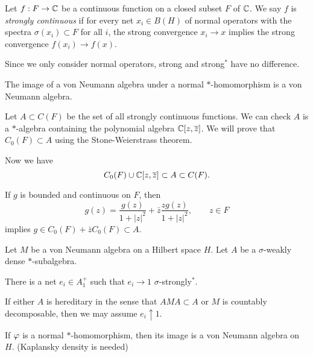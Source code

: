 \documentclass{../../large}
\begin{document}
\begin{prb}
Let $f:F\to\mathbb{C}$ be a continuous function on a closed subset $F$ of $\mathbb{C}$.
We say $f$ is \emph{strongly continuous} if for every net $x_i\in B(H)$ of normal operators with the spectra $\sigma(x_i)\subset F$ for all $i$, the strong convergence $x_i\to x$ implies the strong convergence $f(x_i)\to f(x)$.

\begin{parts}
\item Since we only consider normal operators, strong and strong$^*$ have no difference.
\item The image of a von Neumann algebra under a normal $*$-homomorphism is a von Neumann algebra.
\end{parts}

\end{prb}
\begin{pf}
Let $A\subset C(F)$ be the set of all strongly continuous functions.
We can check $A$ is a $*$-algebra containing the polynomial algebra $\mathbb{C}[z,\overline z]$.
We will prove that $C_0(F)\subset A$ using the Stone-Weierstrass theorem.

Now we have
\[C_0(F)\cup\mathbb{C}[z,\overline z]\subset A\subset C(F).\]

If $g$ is bounded and continuous on $F$, then
\[g(z)=\frac{g(z)}{1+|z|^2}+\bar z\frac{zg(z)}{1+|z|^2},\qquad z\in F\]
implies $g\in C_0(F)+\bar zC_0(F)\subset A$.

\end{pf}



\begin{prb}
Let $M$ be a von Neumann algebra on a Hilbert space $H$.
Let $A$ be a $\sigma$-weakly dense $*$-subalgebra.
\begin{parts}
\item There is a net $e_i\in A_1^+$ such that $e_i\to1$ $\sigma$-strongly$^*$.
\item If either $A$ is hereditary in the sense that $AMA\subset A$ or $M$ is countably decomposable, then we may assume $e_i\uparrow1$.
\end{parts}
\end{prb}



\begin{parts}
\item If $\varphi$ is a normal $*$-homomorphism, then its image is a von Neumann algebra on $H$. (Kaplansky density is needed)
\end{parts}
\end{document}
